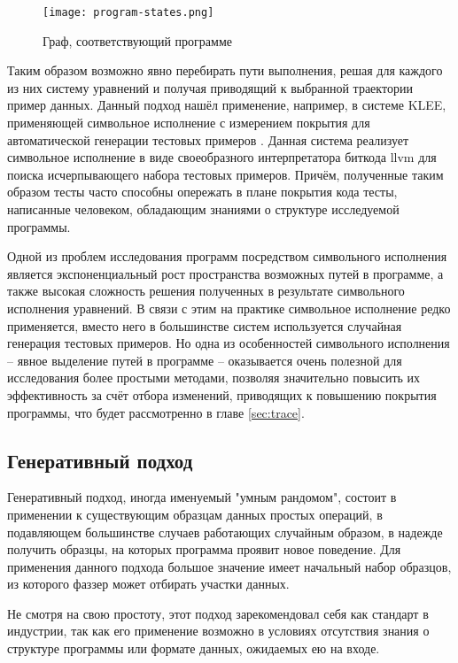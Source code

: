 \begin{figure}[h]
	\centering
	\texttt{[image: program-states.png]}
	\caption{Граф, соответствующий программе}
	\label{fig:py-control-flow-graph}
\end{figure}%

Таким образом возможно явно перебирать пути выполнения, решая для каждого из них систему уравнений и получая приводящий к выбранной траектории пример данных. Данный подход нашёл применение, например, в системе KLEE, применяющей символьное исполнение с измерением покрытия для автоматической генерации тестовых примеров \cite{klee}. Данная система реализует символьное исполнение в виде своеобразного интерпретатора биткода llvm для поиска исчерпывающего набора тестовых примеров. Причём, полученные таким образом тесты часто способны опережать в плане покрытия кода тесты, написанные человеком, обладающим знаниями о структуре исследуемой программы.

Одной из проблем исследования программ посредством символьного исполнения является экспоненциальный рост пространства возможных путей в программе, а также высокая сложность решения полученных в результате символьного исполнения уравнений. В связи с этим на практике символьное исполнение редко применяется, вместо него в большинстве систем используется случайная генерация тестовых примеров. Но одна из особенностей символьного исполнения -- явное выделение путей в программе -- оказывается очень полезной для исследования более простыми методами, позволяя значительно повысить их эффективность за счёт отбора изменений, приводящих к повышению покрытия программы, что будет рассмотренно в главе \ref{sec:trace}.

\subsection{Генеративный подход}

Генеративный подход, иногда именуемый "умным рандомом", состоит в применении к существующим образцам данных простых операций, в подавляющем большинстве случаев работающих случайным образом, в надежде получить образцы, на которых программа проявит новое поведение. Для применения данного подхода большое значение имеет начальный набор образцов, из которого фаззер может отбирать участки данных.

Не смотря на свою простоту, этот подход зарекомендовал себя как стандарт в индустрии, так как его применение возможно в условиях отсутствия знания о структуре программы или формате данных, ожидаемых ею на входе.

